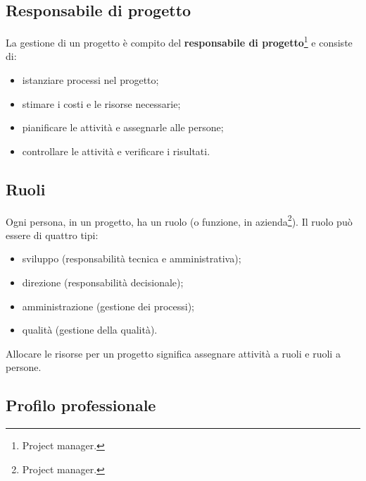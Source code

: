 \documentclass[a4paper]{article}
\begin{document}
		
	\subsection{Responsabile di progetto}

		
La gestione di un progetto è compito del \textbf{responsabile di progetto}\footnote{Project manager.} e consiste di:
		
	\begin{itemize}
		
			
	\item istanziare processi nel progetto;
			
	\item stimare i costi e le risorse necessarie;
			
	\item pianificare le attività e assegnarle alle persone;
			
	\item controllare le attività e verificare i risultati.
		
	\end{itemize}


		
	\subsection{Ruoli}

		
Ogni persona, in un progetto, ha un ruolo (o funzione, in azienda\footnote{Project manager.}). Il ruolo può essere di quattro tipi:
		
	\begin{itemize}
		
			
	\item sviluppo (responsabilità tecnica e amministrativa);
			
	\item direzione (responsabilità decisionale);
			
	\item amministrazione (gestione dei processi);
			
	\item qualità (gestione della qualità).
		
	\end{itemize}

		
Allocare le risorse per un progetto significa assegnare attività a ruoli e ruoli a persone.

		
	\subsection{Profilo professionale}
\end{document}
